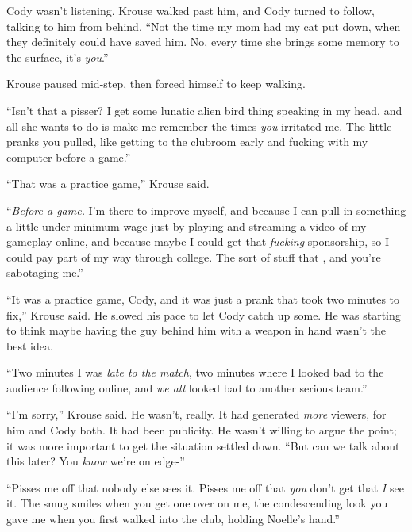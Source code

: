 Cody wasn't listening.  Krouse walked past him, and Cody turned to follow, talking to him from behind.  ``Not the time my mom had my cat put down, when they definitely could have saved him.  No, every time she brings some memory to the surface, it's \emph{you}.''



Krouse paused mid-step, then forced himself to keep walking.



``Isn't that a pisser?  I get some lunatic alien bird thing speaking in my head, and all she wants to do is make me remember the times \emph{you }irritated me.  The little pranks you pulled, like getting to the clubroom early and fucking with my computer before a game.''



``That was a practice game,'' Krouse said.



``\emph{Before a game.  }I'm there to improve myself, and because I can pull in something a little under minimum wage just by playing and streaming a video of my gameplay online, and because maybe I could get that \emph{fucking} sponsorship, so I could pay part of my way through college.  The sort of stuff that , and you're sabotaging me.''



``It was a practice game, Cody, and it was just a prank that took two minutes to fix,'' Krouse said.  He slowed his pace to let Cody catch up some.  He was starting to think maybe having the guy behind him with a weapon in hand wasn't the best idea.



``Two minutes I was \emph{late to the match}, two minutes where I looked bad to the audience following online, and \emph{we all} looked bad to another serious team.''



``I'm sorry,'' Krouse said.  He wasn't, really.  It had generated \emph{more} viewers, for him and Cody both.  It had been publicity.  He wasn't willing to argue the point; it was more important to get the situation settled down.  ``But can we talk about this later?  You \emph{know} we're on edge-''



``Pisses me off that nobody else sees it.  Pisses me off that \emph{you} don't get that \emph{I} see it.  The smug smiles when you get one over on me, the condescending look you gave me when you first walked into the club, holding Noelle's hand.''



